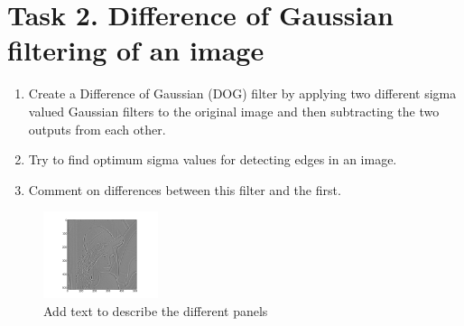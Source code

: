 \documentclass[12pt,english]{scrartcl}
\begin{document}
 

\section*{Task 2. Difference of Gaussian filtering of an image}

\begin{enumerate}
 \item Create a Difference of Gaussian (DOG) filter by applying two different sigma valued Gaussian filters to the original image and then subtracting the two outputs from each other.
 \item Try to find optimum sigma values for detecting edges in an image.
 \item Comment on differences between this filter and the first.
\end{enumerate}
\begin{figure}[htbp]
\includegraphics[width=0.3\textwidth]{Figures/Edge_detection_1/Figure2ED.png}
\caption{Add text to describe the different panels}
\label{fig:lena_edge}
\end{figure}

 
\end{document}
